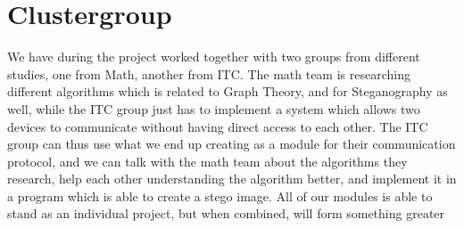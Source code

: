 \section*{Clustergroup}
We have during the project worked together with two groups from different studies, one from Math, another from ITC. 
The math team is researching different algorithms which is related to Graph Theory, and for Steganography as well, while the ITC group just has to implement a system which allows two devices to communicate without having direct access to each other.
The ITC group can thus use what we end up creating as a module for their communication protocol, and we can talk with the math team about the algorithms they research, help each other understanding the algorithm better, and implement it in a program which is able to create a stego image. 
All of our modules is able to stand as an individual project, but when combined, will form something greater